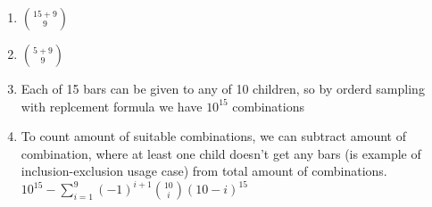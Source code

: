 \begin{enumerate}[label=(\alph*)]
\item $\binom{15+9}{9}$

\item $\binom{5+9}{9}$

\item 
Each of 15 bars can be given to any of 10 children, so by orderd sampling with replcement
formula we have $10^{15}$ combinations

\item
To count amount of suitable combinations, we can subtract amount of combination, where at
least one child doesn't get any bars (is example of inclusion-exclusion usage case) from
total amount of combinations.\\
$10^{15} - \sum_{i=1}^{9}\left(-1\right)^{i+1}\binom{10}{i}\left(10-i\right)^{15}$
\end{enumerate}
